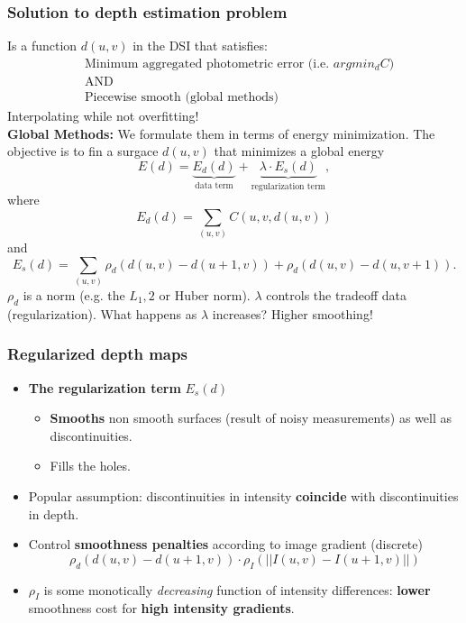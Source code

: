 \documentclass[a4paper,12 pt]{article}
\theoremstyle{definition}
\theoremstyle{remark}
\theoremstyle{definition}
\theoremstyle{definition}
\theoremstyle{definition}
\theoremstyle{remark}
\theoremstyle{definition}
\begin{document}
\subsubsection*{Solution to depth estimation problem}
Is a function $d(u,v)$ in the DSI that satisfies:
\begin{equation}
\begin{split}
&\text{Minimum aggregated photometric error (i.e. } argmin_d C)\\
& \text{AND}\\
& \text{Piecewise smooth (global methods)}
\end{split}
\end{equation}
Interpolating while not overfitting!\\
\textbf{Global Methods:} We formulate them in terms of energy minimization. The objective is to fin a surgace $d(u,v)$ that minimizes a global energy
\begin{equation}
E(d)=\underbrace{E_d(d)}_{\text{data term}}+\underbrace{\lambda \cdot E_s(d)}_{\text{regularization term}},
\end{equation}
where 
\begin{equation}
E_d(d)=\sum_{(u,v)} C(u,v,d(u,v))
\end{equation}
and
\begin{equation}
E_s(d)=\sum_{(u,v)}\rho_d(d(u,v)-d(u+1,v))+\rho_d(d(u,v)-d(u,v+1)).
\end{equation}
$\rho_d$ is a norm (e.g. the $L_1,2$ or Huber norm). $\lambda$ controls the tradeoff data (regularization). What happens as $\lambda$ increases? Higher smoothing!
\subsubsection*{Regularized depth maps}
\begin{itemize}
\item \textbf{The regularization term} $E_s(d)$
\begin{itemize}
\item \textbf{Smooths} non smooth surfaces (result of noisy measurements) as well as discontinuities.
\item Fills the holes.
\end{itemize}
\item Popular assumption: discontinuities in intensity \textbf{coincide} with discontinuities in depth.
\item Control \textbf{smoothness penalties} according to image gradient (discrete)
\begin{equation}
\rho_d(d(u,v)-d(u+1,v))\cdot \rho_I(||I(u,v)-I(u+1,v)||)
\end{equation}
\item $\rho_I$ is some monotically \textit{decreasing} function of intensity differences: \textbf{lower} smoothness cost for \textbf{high intensity gradients}.
\end{itemize}
\end{document}
